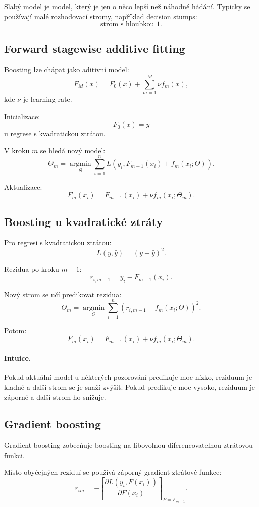 Slabý model je model, který je jen o něco lepší než náhodné hádání. Typicky se používají malé rozhodovací
stromy, například decision stumps:
\[
\text{strom s hloubkou } 1.
\]

\subsection{Forward stagewise additive fitting}

Boosting lze chápat jako aditivní model:
\[
F_M(x)
=
F_0(x)
+
\sum_{m=1}^M
\nu f_m(x),
\]
kde $\nu$ je learning rate.

Inicializace:
\[
F_0(x)=\bar{y}
\]
u regrese s kvadratickou ztrátou.

V kroku $m$ se hledá nový model:
\[
\Theta_m
=
\underset{\Theta}{\operatorname{argmin}}
\sum_{i=1}^n
L
\left(
y_i,
F_{m-1}(x_i)+f_m(x_i;\Theta)
\right).
\]

Aktualizace:
\[
F_m(x_i)
=
F_{m-1}(x_i)
+
\nu f_m(x_i;\Theta_m).
\]

\subsection{Boosting u kvadratické ztráty}

Pro regresi s kvadratickou ztrátou:
\[
L(y,\hat{y})=(y-\hat{y})^2.
\]

Rezidua po kroku $m-1$:
\[
r_{i,m-1}
=
y_i-F_{m-1}(x_i).
\]

Nový strom se učí predikovat rezidua:
\[
\Theta_m
=
\underset{\Theta}{\operatorname{argmin}}
\sum_{i=1}^n
\left(
r_{i,m-1}-f_m(x_i;\Theta)
\right)^2.
\]

Potom:
\[
F_m(x_i)
=
F_{m-1}(x_i)
+
\nu f_m(x_i;\Theta_m).
\]

\paragraph{Intuice.}
Pokud aktuální model u některých pozorování predikuje moc nízko, reziduum je kladné a další strom se je snaží
zvýšit. Pokud predikuje moc vysoko, reziduum je záporné a další strom ho snižuje.

\subsection{Gradient boosting}

Gradient boosting zobecňuje boosting na libovolnou diferencovatelnou ztrátovou funkci.

Místo obyčejných reziduí se používá záporný gradient ztrátové funkce:
\[
r_{im}
=
-
\left[
\frac{\partial L(y_i,F(x_i))}
{\partial F(x_i)}
\right]_{F=F_{m-1}}.
\]

